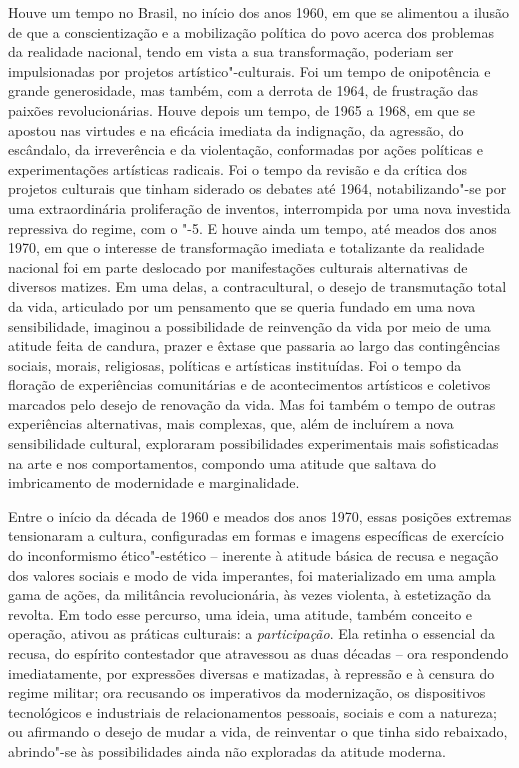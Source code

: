 \pagebreak
\thispagestyle{empty}

\movetooddpage

Houve um tempo no Brasil, no início dos anos 1960, em que se alimentou a
ilusão de que a conscientização e a mobilização política do povo acerca
dos problemas da realidade nacional, tendo em vista a sua transformação,
poderiam ser impulsionadas por projetos artístico"-culturais. Foi um
tempo de onipotência e grande generosidade, mas também, com a derrota de
1964, de frustração das paixões revolucionárias. Houve depois um tempo,
de 1965 a 1968, em que se apostou nas virtudes e na eficácia imediata da
indignação, da agressão, do escândalo, da irreverência e da violentação,
conformadas por ações políticas e experimentações artísticas radicais.
Foi o tempo da revisão e da crítica dos projetos culturais que tinham
siderado os debates até 1964, notabilizando"-se por uma extraordinária
proliferação de inventos, interrompida por uma nova investida repressiva
do regime, com o "-5. E houve ainda um tempo, até meados dos anos 1970,
em que o interesse de transformação imediata e totalizante da realidade
nacional foi em parte deslocado por manifestações culturais alternativas
de diversos matizes. Em uma delas, a contracultural, o desejo de
transmutação total da vida, articulado por um pensamento que se queria
fundado em uma nova sensibilidade, imaginou a possibilidade de
reinvenção da vida por meio de uma atitude feita de candura, prazer e
êxtase que passaria ao largo das contingências sociais, morais,
religiosas, políticas e artísticas instituídas. Foi o tempo da floração
de experiências comunitárias e de acontecimentos artísticos e coletivos
marcados pelo desejo de renovação da vida. Mas foi também o tempo de
outras experiências alternativas, mais complexas, que, além de incluírem
a nova sensibilidade cultural, exploraram possibilidades experimentais
mais sofisticadas na arte e nos comportamentos, compondo uma atitude que
saltava do imbricamento de modernidade e marginalidade.

Entre o início da década de 1960 e meados dos anos 1970, essas posições
extremas tensionaram a cultura, configuradas em formas e imagens
específicas de exercício do inconformismo ético"-estético -- inerente à
atitude básica de recusa e negação dos valores sociais e modo de vida
imperantes, foi materializado em uma ampla gama de ações, da militância
revolucionária, às vezes violenta, à estetização da revolta. Em todo
esse percurso, uma ideia, uma atitude, também conceito e operação,
ativou as práticas culturais: a \emph{participação}. Ela retinha o
essencial da recusa, do espírito contestador que atravessou as duas
décadas -- ora respondendo imediatamente, por expressões diversas e
matizadas, à repressão e à censura do regime militar; ora recusando os
imperativos da modernização, os dispositivos tecnológicos e industriais
de relacionamentos pessoais, sociais e com a natureza; ou afirmando o
desejo de mudar a vida, de reinventar o que tinha sido rebaixado,
abrindo"-se às possibilidades ainda não exploradas da atitude moderna.

